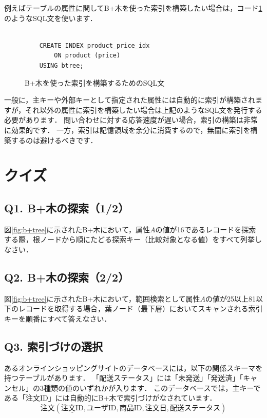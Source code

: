 例えばテーブルの属性に関してB+木を使った索引を構築したい場合は，コード\ref{code:sql-create-btree-index}のようなSQL文を使います．
\begin{figure}[h]
    \begin{verbatim}

    CREATE INDEX product_price_idx
        ON product (price)
    USING btree;

    \end{verbatim}
    \captionsetup{name=コード}
    \caption{B+木を使った索引を構築するためのSQL文}
    \label{code:sql-create-btree-index}
\end{figure}

一般に，主キーや外部キーとして指定された属性には自動的に索引が構築されますが，それ以外の属性に索引を構築したい場合は上記のようなSQL文を発行する必要があります．
問い合わせに対する応答速度が遅い場合，索引の構築は非常に効果的です．
一方，索引は記憶領域を余分に消費するので，無闇に索引を構築するのは避けるべきです．



\section{クイズ}

\subsection*{Q1. B+木の探索（1/2）}
図\ref{fig:b+tree}に示されたB+木において，属性$A$の値が16であるレコードを探索する際，根ノードから順にたどる探索キー（比較対象となる値）をすべて列挙しなさい．

\subsection*{Q2. B+木の探索（2/2）}
図\ref{fig:b+tree}に示されたB+木において，範囲検索として属性$A$の値が25以上81以下のレコードを取得する場合，葉ノード（最下層）においてスキャンされる索引キーを順番にすべて答えなさい．


\subsection*{Q3. 索引づけの選択}
あるオンラインショッピングサイトのデータベースには，以下の関係スキーマを持つテーブルがあります．
「配送ステータス」には「未発送」「発送済」「キャンセル」の3種類の値のいずれかが入ります．
このデータベースでは，主キーである「注文ID」には自動的にB+木で索引づけがなされています．
\begin{equation}
\textbf{注文}(\underline{\text{注文ID}}, \text{ユーザID}, \text{商品ID}, \text{注文日}, \text{配送ステータス})
\end{equation}

